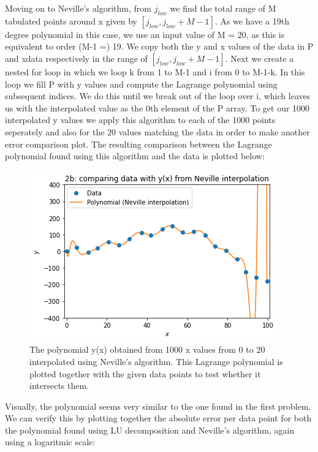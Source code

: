 Moving on to Neville's algorithm, from $j_{low}$ we find the total range of M tabulated points around x given by $[j_{low},j_{low}+M-1]$. As we have a 19th degree polynomial in this case, we use an input value of M = 20, as this is equivalent to order (M-1 =) 19. We copy both the y and x values of the data in P and xdata respectively in the range of $[j_{low},j_{low}+M-1]$. Next we create a nested for loop in which we loop k from 1 to M-1 and i from 0 to M-1-k. In this loop we fill P with y values and compute the Lagrange polynomial using subsequent indices. We do this until we break out of the loop over i, which leaves us with the interpolated value as the 0th element of the P array. To get our 1000 interpolated y values we apply this algorithm to each of the 1000 points seperately and also for the 20 values matching the data in order to make another error comparison plot. The resulting comparison between the Lagrange polynomial found using this algorithm and the data is plotted below:

\begin{figure}[h!]
  \centering
  \includegraphics[width=0.6\linewidth]{problem2b1.png}
  \caption{The polynomial y(x) obtained from 1000 x values from 0 to 20 interpolated using Neville's algorithm. This Lagrange polynomial is plotted together with the given data points to test whether it intersects them.}
  \label{fig:fig3}
\end{figure}

Visually, the polynomial seems very similar to the one found in the first problem. We can verify this by plotting together the absolute error per data point for both the polynomial found using LU decomposition and Neville's algorithm, again using a logaritmic scale: 

